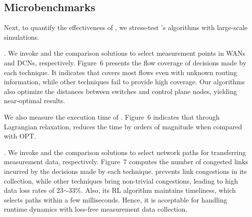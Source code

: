 \subsection{Microbenchmarks}

Next, to quantify the effectiveness of \sysname, we stress-test \sysname's algorithms with large-scale simulations. 

. We invoke \sysname and the comparison solutions to select measurement points in WANs and DCNs, respectively. Figure~6 presents the flow coverage of decisions made by each technique. It indicates that \sysname covers most flows even with unknown routing information, while other techniques fail to provide high coverage. Our algorithms also optimize the distances between switches and control plane nodes, yielding near-optimal results. 

We also measure the execution time of \sysname. Figure~6 indicates that through Lagrangian relaxation, \sysname reduces the time by orders of magnitude when compared with OPT. 


. We invoke \sysname and the comparison solutions to select network paths for transferring measurement data, respectively. Figure~7 computes the number of congested links incurred by the decisions made by each technique. \sysname prevents link congestions in its collection, while other techniques bring non-trivial congestions, leading to high data loss rates of 23$\sim$33\%. Also, its RL algorithm maintains timeliness, which selects paths within a few milliseconds. Hence, it is acceptable for handling runtime dynamics with loss-free measurement data collection. 




